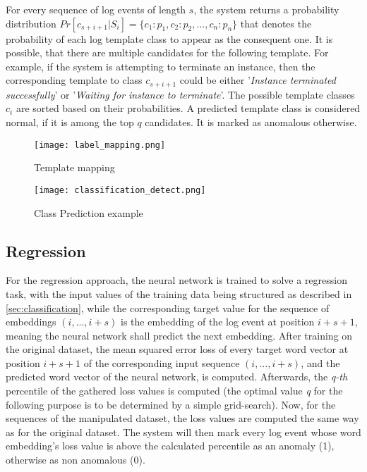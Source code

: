  For every sequence of log events of length $s$, the system returns a probability distribution $Pr[c_{s+i+1}|S_i] = \{c_1 : p_1, c_2 : p_2, ..., c_n : p_n\}$ that denotes the probability of each log template class to appear as the consequent one. It is possible, that there are multiple candidates for the following template. For example, if the system is attempting to terminate an instance, then the corresponding template to class $c_{s+i+1}$ could be either '\textit{Instance terminated successfully}' or '\textit{Waiting for instance to terminate}'. The possible template classes $c_i$ are sorted based on their probabilities. A predicted template class is considered normal, if it is among the top $q$ candidates. It is marked as anomalous otherwise.
 

\begin{figure}[H]
	\centering
	\captionsetup{justification=centering}
	\texttt{[image: label\_mapping.png]}
	\caption{Template mapping}
	\label{fig:label_mapping}
\end{figure}

\begin{figure}[H]
	\centering	
	\texttt{[image: classification\_detect.png]}
	\caption{Class Prediction example}
	\label{fig:label_mapping}
\end{figure}

\subsection{Regression \label{sec:regression}}
For the regression approach, the neural network is trained to solve a regression task, with the input values of the training data being structured as described in \ref{sec:classification}, while the corresponding target value for the sequence of embeddings $(i, ..., i+s)$ is the embedding of the log event at position $i+s+1$, meaning the neural network shall predict the next embedding. After training on the original dataset, the mean squared error loss of every target word vector at position $i+s+1$ of the corresponding input sequence $(i, ..., i+s)$, and the predicted word vector of the neural network, is computed. Afterwards, the \textit{q-th} percentile of the gathered loss values is computed (the optimal value \textit{q} for the following purpose is to be determined by a simple grid-search). Now, for the sequences of the manipulated dataset, the loss values are computed the same way as for the original dataset. The system will then mark every log event whose word embedding's loss value is above the calculated percentile as an anomaly (1), otherwise as non anomalous (0). 







